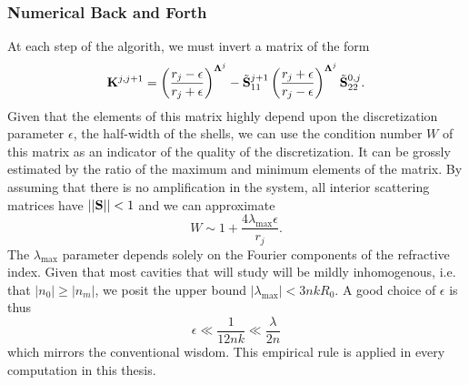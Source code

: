 \subsubsection{Numerical Back and Forth}
At each step of the algorith, we must invert
a matrix of the form 
  \begin{equation}
  \mathbf{K}^{j,j+1} = \left(\frac{r_j-\epsilon}{r_j+\epsilon}\right)^{\boldsymbol{\Lambda}^j}
		    -\tilde{\mathbf{S}}^{j+1}_{11}\left(\frac{r_j+\epsilon}{r_j-\epsilon}\right)^{\boldsymbol{\Lambda}^j}\tilde{\mathbf{S}}^{0,j}_{22}.
  \end{equation}
Given that the elements of this matrix highly depend upon the discretization
parameter $\epsilon$, the half-width of the shells, we can use the
condition number $W$ of this matrix as an indicator of the quality
of the discretization. It can be grossly estimated by the 
ratio of the maximum and minimum elements of the matrix. 
By assuming that there is no amplification in the system,
all interior scattering matrices have
$||\mathbf{S}||<1$ and we can approximate
  \begin{equation}
   W \sim 1 + \frac{4\lambda_\text{max}\epsilon}{r_j}.
  \end{equation}
The $\lambda_\text{max}$ parameter depends solely on the 
Fourier components of the refractive index. Given that most 
cavities that will study will be mildly inhomogenous, 
i.e. that $|n_0|\geq|n_m|$, we posit the upper bound 
$|\lambda_\text{max}| < 3nkR_0$. A good choice of 
$\epsilon$ is thus
  \begin{equation}
   \epsilon \ll \frac{1}{12nk} \ll \frac{\lambda}{2n}
  \end{equation}
which mirrors the conventional wisdom. This empirical rule
is applied in every computation in this thesis. 

